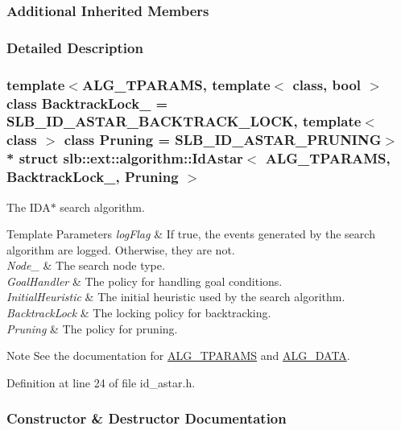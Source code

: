 \subsubsection*{Additional Inherited Members}


\subsubsection{Detailed Description}
\subsubsection*{template$<$A\+L\+G\+\_\+\+T\+P\+A\+R\+A\+MS, template$<$ class, bool $>$ class Backtrack\+Lock\+\_\+ = S\+L\+B\+\_\+\+I\+D\+\_\+\+A\+S\+T\+A\+R\+\_\+\+B\+A\+C\+K\+T\+R\+A\+C\+K\+\_\+\+L\+O\+CK, template$<$ class $>$ class Pruning = S\+L\+B\+\_\+\+I\+D\+\_\+\+A\+S\+T\+A\+R\+\_\+\+P\+R\+U\+N\+I\+NG$>$\\*
struct slb\+::ext\+::algorithm\+::\+Id\+Astar$<$ A\+L\+G\+\_\+\+T\+P\+A\+R\+A\+M\+S, Backtrack\+Lock\+\_\+, Pruning $>$}

The {\ttfamily I\+D\+A$\ast$} search algorithm. 


\begin{DoxyTemplParams}{Template Parameters}
{\em log\+Flag} & If {\ttfamily true}, the events generated by the search algorithm are logged. Otherwise, they are not. \\
\hline
{\em Node\+\_\+} & The search node type. \\
\hline
{\em Goal\+Handler} & The policy for handling goal conditions. \\
\hline
{\em Initial\+Heuristic} & The initial heuristic used by the search algorithm. \\
\hline
{\em Backtrack\+Lock} & The locking policy for backtracking. \\
\hline
{\em Pruning} & The policy for pruning. \\
\hline
\end{DoxyTemplParams}
\begin{DoxyNote}{Note}
See the documentation for \hyperlink{algorithm_8h_a521ad67aee0e10fb76ee132a9d5c0768}{A\+L\+G\+\_\+\+T\+P\+A\+R\+A\+MS} and \hyperlink{algorithm_8h_a64c012078deee9a30405e18ec11e6360}{A\+L\+G\+\_\+\+D\+A\+TA}. 
\end{DoxyNote}


Definition at line 24 of file id\+\_\+astar.\+h.



\subsubsection{Constructor \& Destructor Documentation}
